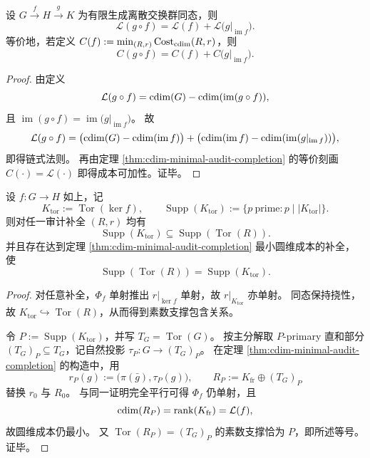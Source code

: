 \begin{corollary}[圆维损失的链式法则与最小成本可加性]\label{cor:cdim-loss-chain-rule}
设 \(G\xrightarrow{f}H\xrightarrow{g}K\) 为有限生成离散交换群同态，则
\[
\mathcal L(g\circ f)=\mathcal L(f)+\mathcal L\!\bigl(g|_{\operatorname{im}f}\bigr).
\]
等价地，若定义
\(
C(f):=\min_{(R,r)}\operatorname{Cost}_{\operatorname{cdim}}(R,r)
\)，则
\[
C(g\circ f)=C(f)+C\!\bigl(g|_{\operatorname{im}f}\bigr).
\]
\end{corollary}
\begin{proof}
由定义
\[
\mathcal L(g\circ f)=\operatorname{cdim}(G)-\operatorname{cdim}(\operatorname{im}(g\circ f)),
\]
且
\(
\operatorname{im}(g\circ f)=\operatorname{im}\bigl(g|_{\operatorname{im}f}\bigr)
\)。
故
\[
\mathcal L(g\circ f)
=\bigl(\operatorname{cdim}(G)-\operatorname{cdim}(\operatorname{im}f)\bigr)
+\bigl(\operatorname{cdim}(\operatorname{im}f)-\operatorname{cdim}(\operatorname{im}(g|_{\operatorname{im}f}))\bigr),
\]
即得链式法则。
再由定理 \ref{thm:cdim-minimal-audit-completion} 的等价刻画 \(C(\cdot)=\mathcal L(\cdot)\) 即得成本可加性。证毕。
\end{proof}

\begin{proposition}[审计补全有限部的素数支撑不可避免性]\label{prop:cdim-completion-prime-support-necessity}
设 \(f:G\to H\) 如上，记
\[
K_{\mathrm{tor}}:=\operatorname{Tor}(\ker f),\qquad
\operatorname{Supp}(K_{\mathrm{tor}})
:=\{p\ \text{prime}:p\mid |K_{\mathrm{tor}}|\}.
\]
则对任一审计补全 \((R,r)\) 均有
\[
\operatorname{Supp}(K_{\mathrm{tor}})
\subseteq
\operatorname{Supp}(\operatorname{Tor}(R)).
\]
并且存在达到定理 \ref{thm:cdim-minimal-audit-completion} 最小圆维成本的补全，使
\[
\operatorname{Supp}(\operatorname{Tor}(R))
=
\operatorname{Supp}(K_{\mathrm{tor}}).
\]
\end{proposition}
\begin{proof}
对任意补全，\(\Phi_f\) 单射推出 \(r|_{\ker f}\) 单射，故 \(r|_{K_{\mathrm{tor}}}\) 亦单射。
同态保持挠性，故 \(K_{\mathrm{tor}}\hookrightarrow \operatorname{Tor}(R)\)，从而得到素数支撑包含关系。

令 \(P:=\operatorname{Supp}(K_{\mathrm{tor}})\)，并写 \(T_G=\operatorname{Tor}(G)\)。
按主分解取 \(P\)-primary 直和部分 \((T_G)_P\subseteq T_G\)，记自然投影 \(\tau_P:G\to (T_G)_P\)。
在定理 \ref{thm:cdim-minimal-audit-completion} 的构造中，用
\[
r_P(g):=\bigl(\pi(\bar g),\tau_P(g)\bigr),\qquad
R_P:=K_{\mathrm{fr}}\oplus (T_G)_P
\]
替换 \(r_0\) 与 \(R_0\)。
与同一证明完全平行可得 \(\Phi_f\) 仍单射，且
\[
\operatorname{cdim}(R_P)=\operatorname{rank}(K_{\mathrm{fr}})=\mathcal L(f),
\]
故圆维成本仍最小。
又 \(\operatorname{Tor}(R_P)=(T_G)_P\) 的素数支撑恰为 \(P\)，即所述等号。证毕。
\end{proof}

